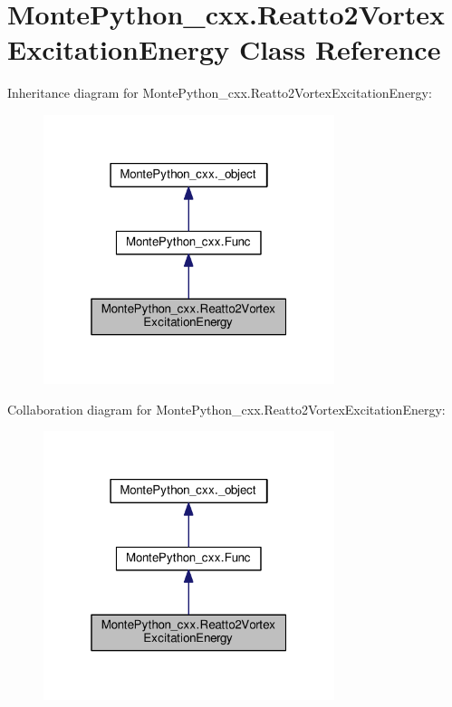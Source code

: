 \hypertarget{classMontePython__cxx_1_1Reatto2VortexExcitationEnergy}{}\section{Monte\+Python\+\_\+cxx.\+Reatto2\+Vortex\+Excitation\+Energy Class Reference}
\label{classMontePython__cxx_1_1Reatto2VortexExcitationEnergy}


Inheritance diagram for Monte\+Python\+\_\+cxx.\+Reatto2\+Vortex\+Excitation\+Energy\+:
\nopagebreak
\begin{figure}[H]
\begin{center}
\leavevmode
\includegraphics[width=241pt]{classMontePython__cxx_1_1Reatto2VortexExcitationEnergy__inherit__graph}
\end{center}
\end{figure}


Collaboration diagram for Monte\+Python\+\_\+cxx.\+Reatto2\+Vortex\+Excitation\+Energy\+:
\nopagebreak
\begin{figure}[H]
\begin{center}
\leavevmode
\includegraphics[width=241pt]{classMontePython__cxx_1_1Reatto2VortexExcitationEnergy__coll__graph}
\end{center}
\end{figure}
